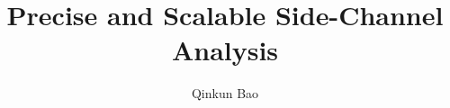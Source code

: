 \documentclass[phd,12pt]{psuthesis}
\title{Precise and Scalable Side-Channel Analysis}
\author{Qinkun Bao}
\begin{document}
\pagestyle{fancy}
\fancyhead[L,C,R]{}
\fancyfoot[L,R]{}
\fancyfoot[C]{\thepage}
\renewcommand{\headrulewidth}{0pt}
\renewcommand{\footrulewidth}{0pt}
\frontmatter

%

\psutitlepage

\psucommitteepage


\thesistableofcontents

\begin{singlespace}
\renewcommand{\listfigurename}{\sffamily\Huge List of Figures}
\setlength{\cftparskip}{\baselineskip}
\listoffigures
\end{singlespace}
\clearpage

\begin{singlespace}
\renewcommand{\listtablename}{\sffamily\Huge List of Tables}
\setlength{\cftparskip}{\baselineskip}
\listoftables
\end{singlespace}
\clearpage

\end{document}

